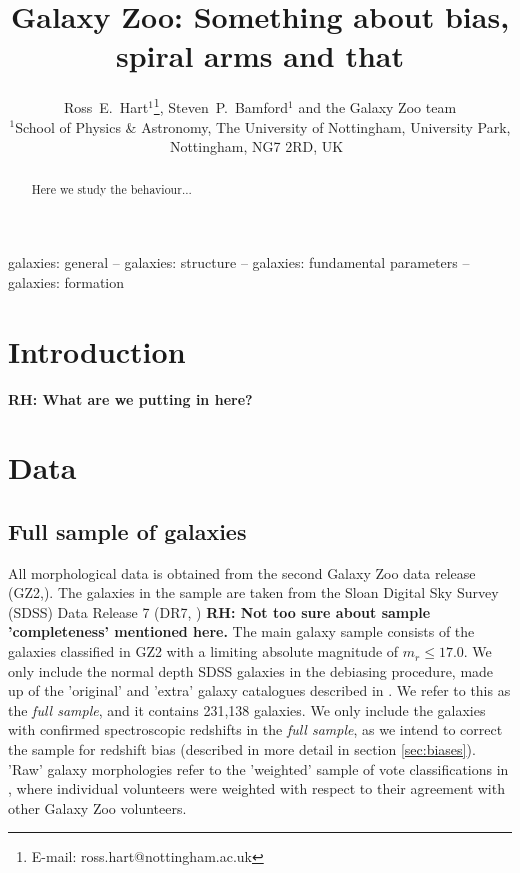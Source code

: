 \documentclass[useAMS,usenatbib]{mn2e}
\newcommand{\rh}[1]{{\bf \textcolor{RoyalPurple}{RH: #1}}}
\begin{document}
\title{Galaxy Zoo: Something about bias, spiral arms and that}
\author[Hart et al.]{Ross~E.~Hart$^1$\thanks{E-mail: ross.hart@nottingham.ac.uk}, Steven~P.~Bamford$^1$ and the Galaxy Zoo team
\smallskip\\
$^{1}$School of Physics \& Astronomy, The University of Nottingham, University Park, Nottingham, NG7 2RD, UK\
}
\maketitle
\begin{abstract}
Here we study the behaviour...
\end{abstract}

\begin{keywords}
galaxies: general -- galaxies: structure -- galaxies: fundamental parameters -- galaxies: formation
\end{keywords}

\section{Introduction}
\label{sec:intro}

\rh{What are we putting in here?}

\section{Data}
\label{sec:data}

\subsection{Full sample of galaxies}

All morphological data is obtained from the second Galaxy Zoo data release (GZ2,\citet{Willett_13}). The galaxies in the sample are taken from the Sloan Digital Sky Survey (SDSS) Data Release 7 (DR7, \citet{Abazijian_09}) \rh{Not too sure about sample 'completeness' mentioned here.} The main galaxy sample consists of the galaxies classified in GZ2 with a limiting absolute magnitude of $m_r \leq 17.0$. We only include the normal depth SDSS galaxies in the debiasing procedure, made up of the 'original' and 'extra' galaxy catalogues described in \citep{Willett_13}. We refer to this as the \textit{full sample}, and it contains 231,138 galaxies. We only include the galaxies with confirmed spectroscopic redshifts in the \textit{full sample}, as we intend to correct the sample for redshift bias (described in more detail in section \ref{sec:biases}). 'Raw' galaxy morphologies refer to the 'weighted' sample of vote classifications in \citep{Willett_13}, where individual volunteers were weighted with respect to their agreement with other Galaxy Zoo volunteers. 
\end{document}
